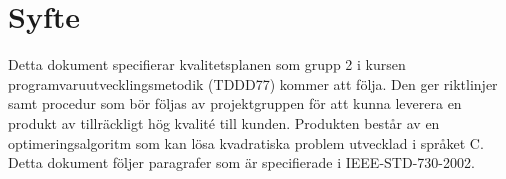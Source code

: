 \section{Syfte}
Detta dokument specifierar kvalitetsplanen som grupp 2 i kursen programvaruutvecklingsmetodik (TDDD77) kommer att följa. Den ger riktlinjer samt procedur som bör följas av projektgruppen för att kunna leverera en produkt av tillräckligt hög kvalité till kunden. Produkten består av en optimeringsalgoritm som kan lösa kvadratiska problem utvecklad i språket C. Detta dokument följer paragrafer som är specifierade i IEEE-STD-730-2002.